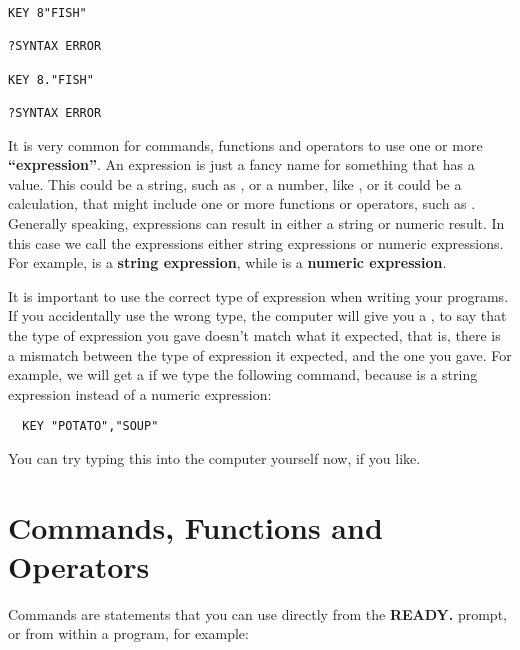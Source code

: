\newpage
\begin{tcolorbox}[colback=black,coltext=white]
\verbatimfont{\codefont}
\begin{verbatim}
KEY 8"FISH"

?SYNTAX ERROR

KEY 8."FISH"

?SYNTAX ERROR
\end{verbatim}
\end{tcolorbox}


It is very common for commands, functions and operators to use one or
more {\bf``expression''}.
An expression is just a fancy name for something that has a value.
This could be a string, such as , or a number, like
, or it could be a calculation, that might include
one or more functions or operators, such as .
Generally speaking, expressions can result in either a string or numeric result.
In this case we call the expressions either string expressions or numeric expressions.
For example,  is a {\bf string expression}, while
 is a {\bf numeric expression}.

It is important to use the correct type of expression when writing your programs.
If you accidentally use the wrong type, the computer will give you a
, to say that the type
of expression you gave doesn't match what it expected, that is, there
 is a mismatch between the type of expression
it expected, and the one you gave.  For example, we will get a
 if we type the following command,
because  is a string expression instead of a numeric expression:

\begin{tcolorbox}[colback=black,coltext=white]
\verbatimfont{\codefont}
\begin{verbatim}
  KEY "POTATO","SOUP"
\end{verbatim}
\end{tcolorbox}

You can try typing this into the computer yourself now, if you like.

\newpage
\section{Commands, Functions and Operators}

Commands are statements that you can use directly from the {\bf READY.}
prompt, or from within a program, for example:

